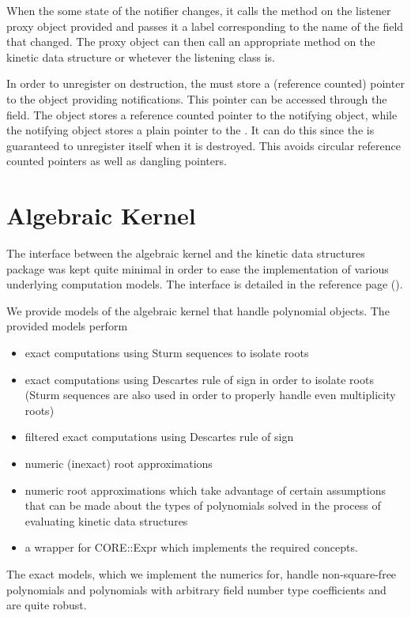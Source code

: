 When the some state of the notifier changes, it calls the
 method on the listener proxy object provided
and passes it a label corresponding to the name of the field that
changed. The proxy object can then call an appropriate method on the
kinetic data structure or whetever the listening class is.

In order to unregister on destruction, the  must store a
(reference counted) pointer to the object providing notifications.
This pointer can be accessed through the  field. The
 object stores a reference counted pointer to the
notifying object, while the notifying object stores a plain pointer to
the . It can do this since the  is
guaranteed to unregister itself when it is destroyed. This avoids
circular reference counted pointers as well as dangling pointers.

\section{Algebraic Kernel\label{sec:kds_algebraic_kernel}}


The interface between the algebraic kernel and the kinetic data
structures package was kept quite minimal in order to ease the
implementation of various underlying computation models. The interface
is detailed in the reference page ().

We provide models of the algebraic kernel that handle polynomial
 objects. The provided models perform
\begin{itemize}
\item exact computations using Sturm sequences to isolate roots
\item exact computations using Descartes rule of sign in order to
  isolate roots (Sturm sequences are also used in order to properly
  handle even multiplicity roots)
\item filtered exact computations using Descartes rule of sign
\item numeric (inexact) root approximations
\item numeric root approximations which take advantage of certain
  assumptions that can be made about the types of polynomials solved
  in the process of evaluating kinetic data structures
\item a wrapper for CORE::Expr which implements the required
  concepts.
\end{itemize}
The exact models, which we implement the numerics for, handle
non-square-free polynomials and polynomials with arbitrary field
number type coefficients and are quite robust.


